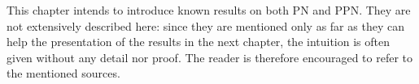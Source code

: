This chapter intends to introduce known results on both \ac{PN} and \ac{PPN}.
They are not extensively described here:
since they are mentioned only as far as they can help the presentation of the results in the next chapter, the intuition is often given without any detail nor proof.
The reader is therefore encouraged to refer to the mentioned sources.

